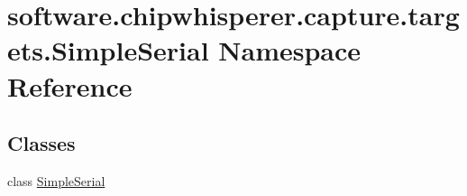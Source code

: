 \hypertarget{namespacesoftware_1_1chipwhisperer_1_1capture_1_1targets_1_1SimpleSerial}{}\section{software.\+chipwhisperer.\+capture.\+targets.\+Simple\+Serial Namespace Reference}
\label{namespacesoftware_1_1chipwhisperer_1_1capture_1_1targets_1_1SimpleSerial}
\subsection*{Classes}
\begin{DoxyCompactItemize}
\item 
class \hyperlink{classsoftware_1_1chipwhisperer_1_1capture_1_1targets_1_1SimpleSerial_1_1SimpleSerial}{Simple\+Serial}
\end{DoxyCompactItemize}
